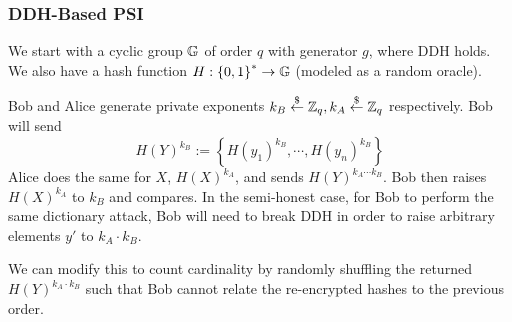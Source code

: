 \subsubsection{DDH-Based PSI}\label{sec:apr04-psi-ddh}
We start with a cyclic group $\mathbb G$ of order $q$ with generator $g$, where DDH holds. We also have a hash function $H: \left\{ 0, 1 \right\}^{*}\to \mathbb G$ (modeled as a random oracle).


Bob and Alice generate private exponents $k_B\overset{\$}{\leftarrow} \mathbb Z_q, k_A\overset{\$}{\leftarrow} \mathbb Z_q$ respectively. Bob will send
\[H(Y)^{k_B} := \left\{ H(y_1)^{k_B}, \cdots, H(y_n)^{k_B} \right\}\]
Alice does the same for $X$, $H(X)^{k_A}$, and sends $H(Y)^{k_A\cdots k_B}$. Bob then raises $H(X)^{k_A}$ to $k_B$ and compares. In the semi-honest case, for Bob to perform the same dictionary attack, Bob will need to break DDH in order to raise arbitrary elements $y'$ to $k_A\cdot k_B$.

We can modify this to count cardinality by randomly shuffling the returned $H(Y)^{k_A\cdot k_B}$ such that Bob cannot relate the re-encrypted hashes to the previous order.

